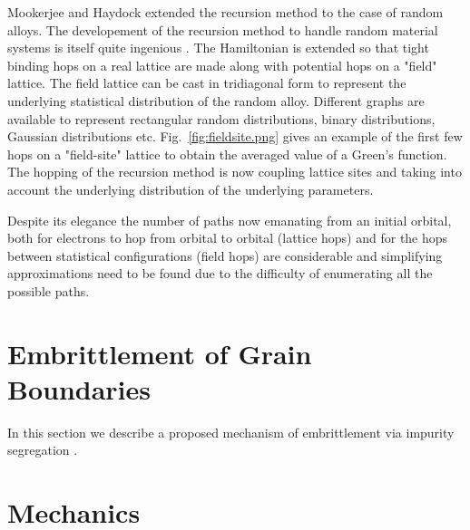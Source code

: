 Mookerjee and Haydock extended the recursion method to the case of random alloys.
The developement of the recursion method to handle random material systems is 
itself quite ingenious \cite{mookerjee , haydock74}. The Hamiltonian is extended
so that tight binding hops on a real lattice are made along with potential hops
on a "field" lattice. The field lattice can be cast in tridiagonal form to represent
the underlying statistical distribution of the random alloy. Different graphs are available
to represent rectangular random distributions, binary distributions, Gaussian distributions
etc. Fig.~\ref{fig:fieldsite.png} gives an example of the first few hops on a "field-site" 
lattice to obtain the averaged value of a Green's function. The hopping of the recursion method
is now coupling lattice sites and taking into account the underlying distribution of 
the underlying parameters.

Despite its elegance the number of paths now emanating from an initial orbital, both
for electrons to hop from orbital to orbital (lattice hops) and for the hops between 
statistical configurations (field hops) are considerable and simplifying approximations 
need to be found due to the difficulty of enumerating all the possible paths.

\section{Embrittlement of Grain Boundaries}
In this section we describe a proposed mechanism of embrittlement via impurity
segregation \cite{haydock82}.

\section{Mechanics}
